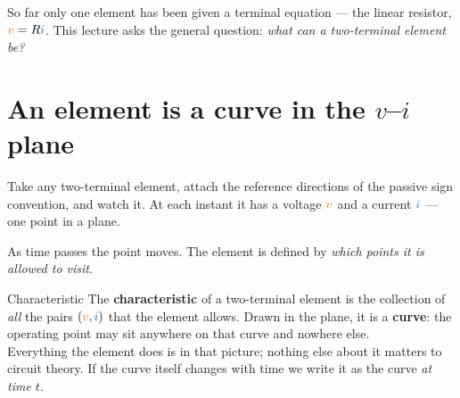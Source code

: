 \documentclass[11pt,a4paper]{article}
\newcommand{\Icol}[1]{\textcolor{ccur}{#1}}
\newcommand{\Vcol}[1]{\textcolor{cvolt}{#1}}
\newcommand{\viaxes}[3]{%
  \draw[vax] (-#1,0) -- (#1,0) node[right=1pt, font=\scriptsize, text=cvolt] {$v$};
  \draw[vax] (0,-#2) -- (0,#2) node[above=1pt, font=\scriptsize, text=ccur] {$i$};
  \node[ttl] at (0,-#2-0.68) {#3};}
\begin{document}
So far only one element has been given a terminal equation --- the linear resistor,
$\Vcol{v} = R\Icol{i}$. This lecture asks the general question: \emph{what can a
two-terminal element be?}

\section{An element is a curve in the $v$--$i$ plane}

Take any two-terminal element, attach the reference directions of the passive sign
convention, and watch it. At each instant it has a voltage $\Vcol{v}$ and a current
$\Icol{i}$ --- one point in a plane.

\begin{center}
\end{center}

As time passes the point moves. The element is defined by \emph{which points it is allowed
to visit}.

\begin{definitionbox}{Characteristic}
The \textbf{characteristic} of a two-terminal element is the collection of \emph{all} the
pairs $(\Vcol{v},\Icol{i})$ that the element allows. Drawn in the plane, it is a
\textbf{curve}: the operating point may sit anywhere on that curve and nowhere else.
\\[3pt]
Everything the element does is in that picture; nothing else about it matters to circuit
theory. If the curve itself changes with time we write it as the curve \emph{at time $t$}.
\end{definitionbox}
\end{document}
